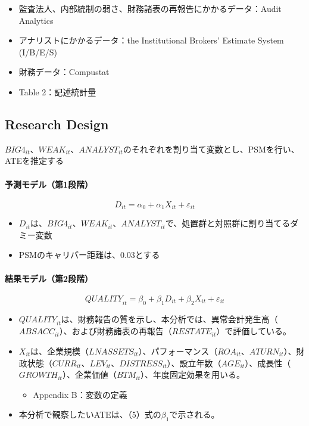 \begin{itemize}
 \item 監査法人、内部統制の弱さ、財務諸表の再報告にかかるデータ：Audit Analytics
 \item アナリストにかかるデータ：the Institutional Brokers’ Estimate System (I/B/E/S)
 \item 財務データ：Compustat
 \item Table 2：記述統計量
\end{itemize}

\subsection*{Research Design}

$\mathit{BIG}4_{it}$、$\mathit{WEAK}_{it}$、$\mathit{ANALYST}_{it}$のそれぞれを割り当て変数とし、PSMを行い、ATEを推定する

\paragraph{予測モデル（第1段階）}

\begin{equation}
\mathit{D}_{it} = \alpha_0 + \alpha_1 \mathit{X}_{it} + \varepsilon_{it}
\end{equation}

\begin{itemize}
 \item $\mathit{D}_{it}$は、$\mathit{BIG}4_{it}$、$\mathit{WEAK}_{it}$、$\mathit{ANALYST}_{it}$で、処置群と対照群に割り当てるダミー変数
 \item PSMのキャリパー距離は、0.03とする
\end{itemize}

\paragraph{結果モデル（第2段階）}

\begin{equation}
\mathit{QUALITY}_{it} = \beta_0 + \beta_1 \mathit{D}_{it} + \beta_2 \mathit{X}_{it} +\varepsilon_{it}
\end{equation}

\begin{itemize}
 \item $\mathit{QUALITY}_{it}$は、財務報告の質を示し、本分析では、異常会計発生高（$\mathit{ABSACC}_{it}$）、および財務諸表の再報告（$\mathit{RESTATE}_{it}$）で評価している。
 \item $X_{it}$は、企業規模（$\mathit{LNASSETS}_{it}$）、パフォーマンス（$\mathit{ROA}_{it}$、$\mathit{ATURN}_{it}$）、財政状態（$\mathit{CURR}_{it}$、$\mathit{LEV}_{it}$、$\mathit{DISTRESS}_{it}$）、設立年数（$\mathit{AGE}_{it}$）、成長性（$\mathit{GROWTH}_{it}$）、企業価値（$\mathit{BTM}_{it}$）、年度固定効果を用いる。
  \begin{itemize}
   \item Appendix B：変数の定義
  \end{itemize}
 \item 本分析で観察したいATEは、（5）式の$\beta_1$で示される。
\end{itemize}

